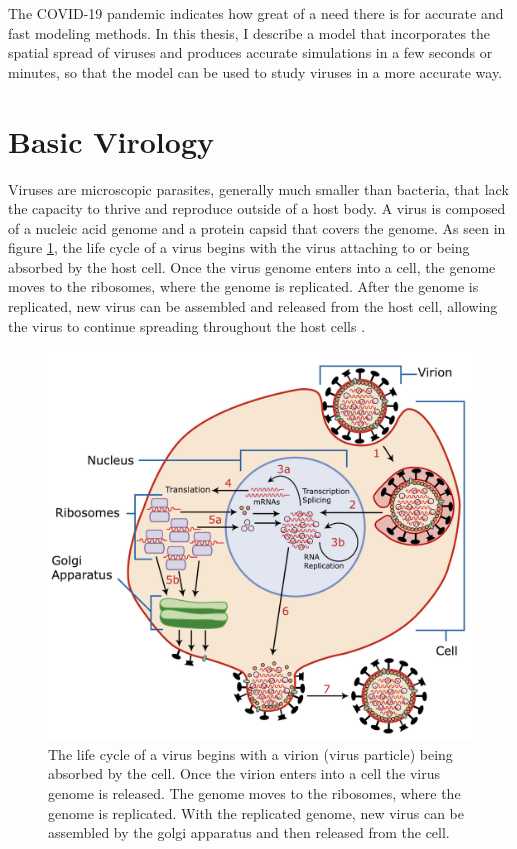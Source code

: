 The COVID-19 pandemic indicates how great of a need there is for accurate and fast modeling methods. In this thesis, I describe a model that incorporates the spatial spread of viruses and produces accurate simulations in a few seconds or minutes, so that the model can be used to study viruses in a more accurate way. 

\section{Basic Virology}

Viruses are microscopic parasites, generally much smaller than bacteria, that lack the capacity to thrive and reproduce outside of a host body. A virus is composed of a nucleic acid genome and a protein capsid that covers the genome. As seen in figure \ref{fig:Virus_Replication}, the life cycle of a virus begins with the virus attaching to or being absorbed by the host cell. Once the virus genome enters into a cell, the genome moves to the ribosomes, where the genome is replicated. After the genome is replicated, new virus can be assembled and released from the host cell, allowing the virus to continue spreading throughout the host cells \citep{openstax_microbiology_2016}.

\begin{figure}[h]
    \centering
    \includegraphics[width=0.6\linewidth]{Figures/Virus_Replication_large.pdf}
    \caption{The life cycle of a virus begins with a virion (virus particle) being absorbed by the cell. Once the virion enters into a cell the virus genome is released. The genome moves to the ribosomes, where the genome is replicated. With the replicated genome, new virus can be assembled by the golgi apparatus and then released from the cell.}
    \label{fig:Virus_Replication}
\end{figure}

